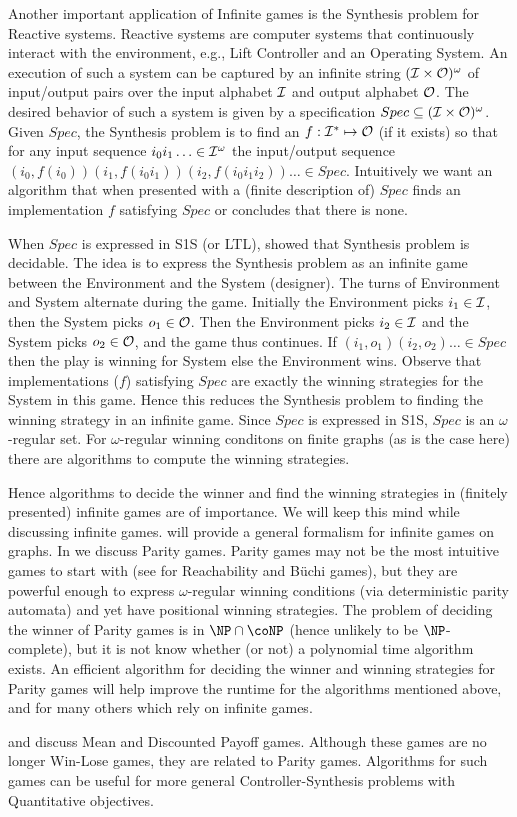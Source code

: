 Another important application of Infinite games is the Synthesis problem for Reactive systems. Reactive systems are computer systems that continuously interact with the environment, e.g., Lift Controller and an Operating System. An execution of such a system can be captured by an infinite string $(\mathcal{I} \times \mathcal{O})^\omega$ of input/output pairs over the input alphabet $\mathcal{I}$ and output alphabet $\mathcal{O}$. The desired behavior of such a system is given by a specification $Spec \subseteq (\mathcal{I} \times \mathcal{O})^\omega$. Given $Spec$, the Synthesis problem is to find an $f: \mathcal{I}^* \mapsto \mathcal{O}$ (if it exists)  so that for any input sequence $i_0i_1 \ldots \in \mathcal{I}^\omega$ the input/output sequence  $(i_0,f(i_0))(i_1,f(i_0i_1))(i_2,f(i_0i_1i_2)) \ldots \in Spec$. Intuitively we want an algorithm that when presented with a (finite description of) $Spec$ finds an implementation $f$ satisfying $Spec$ or concludes that there is none.

When $Spec$ is expressed in S1S (or LTL), \cite{synthesis} showed that Synthesis problem is decidable. The idea is to express the Synthesis problem as an infinite game between the Environment and the System (designer). The turns of Environment and System alternate during the game. Initially the Environment picks $i_1 \in \mathcal{I}$, then the System picks $o_1 \in \mathcal{O}$. Then the Environment picks $i_2 \in \mathcal{I}$ and the System picks $o_2 \in \mathcal{O}$, and the game thus continues. If $(i_1,o_1)(i_2,o_2) \ldots \in Spec$ then the play is winning for System else the Environment wins. Observe that implementations ($f$) satisfying $Spec$ are exactly the winning strategies for the System in this game. Hence this reduces the Synthesis problem to finding the winning strategy in an infinite game. Since $Spec$ is expressed in S1S, $Spec$ is an $\omega$-regular set. For $\omega$-regular winning conditons on finite graphs (as is the case here) there are algorithms to compute the winning strategies.

Hence algorithms to decide the winner and find the winning strategies in (finitely presented) infinite games are of importance. We will keep this mind while discussing infinite games.  will provide a general formalism for infinite games on graphs. In  we discuss Parity games. Parity games may not be the most intuitive games to start with (see \cite[Chap~2]{thomas2002automata} for Reachability and B\"uchi games), but they are powerful enough to express $\omega$-regular winning conditions (via deterministic parity automata) and yet have positional winning strategies. The problem of deciding the winner of Parity games is in $\NP \cap \coNP$ (hence unlikely to be $\NP$-complete), but it is not know whether (or not) a polynomial time algorithm exists. An efficient algorithm for deciding the winner and winning strategies for Parity games will help improve the runtime for the algorithms mentioned above, and for many others which rely on infinite games.

 and  discuss Mean and Discounted Payoff games. Although these games are no longer Win-Lose games, they are related to Parity games. Algorithms for such games can be useful for more general Controller-Synthesis problems with Quantitative objectives.

